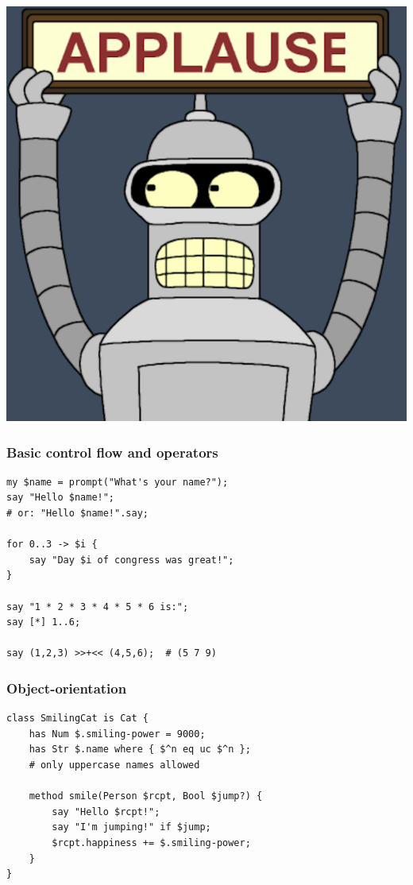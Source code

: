 \documentclass[14pt,compress,english,utf8,t]{beamer}
\begin{document}
\begin{frame}[plain,c]
  \centering
  \includegraphics[scale=0.4]{images/applause}
  \par
\end{frame}

\begin{frame}[fragile]\frametitle{Basic control flow and operators}
  \begin{verbatim}
my $name = prompt("What's your name?");
say "Hello $name!";
# or: "Hello $name!".say;

for 0..3 -> $i {
    say "Day $i of congress was great!";
}

say "1 * 2 * 3 * 4 * 5 * 6 is:";
say [*] 1..6;

say (1,2,3) >>+<< (4,5,6);  # (5 7 9)
  \end{verbatim}
\end{frame}

\begin{frame}[fragile]\frametitle{Object-orientation}
  \begin{verbatim}
class SmilingCat is Cat {
    has Num $.smiling-power = 9000;
    has Str $.name where { $^n eq uc $^n };
    # only uppercase names allowed

    method smile(Person $rcpt, Bool $jump?) {
        say "Hello $rcpt!";
        say "I'm jumping!" if $jump;
        $rcpt.happiness += $.smiling-power;
    }
}
  \end{verbatim}
\end{frame}
\end{document}
